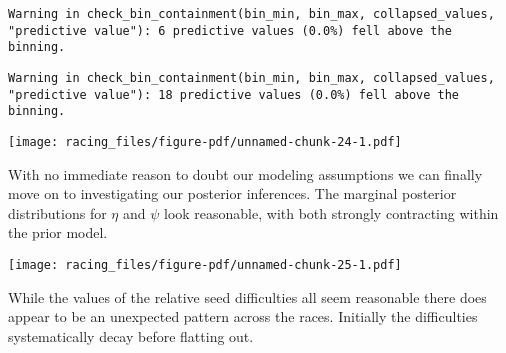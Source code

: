 \documentclass[
  letterpaper,
  DIV=11,
  numbers=noendperiod]{scrartcl}
\newenvironment{Shaded}{\begin{snugshade}}{\end{snugshade}}
\newcommand{\AttributeTok}[1]{\textcolor[rgb]{0.40,0.45,0.13}{#1}}
\newcommand{\DecValTok}[1]{\textcolor[rgb]{0.68,0.00,0.00}{#1}}
\newcommand{\FunctionTok}[1]{\textcolor[rgb]{0.28,0.35,0.67}{#1}}
\newcommand{\NormalTok}[1]{\textcolor[rgb]{0.00,0.23,0.31}{#1}}
\newcommand{\SpecialCharTok}[1]{\textcolor[rgb]{0.37,0.37,0.37}{#1}}
\newcommand{\StringTok}[1]{\textcolor[rgb]{0.13,0.47,0.30}{#1}}
\begin{document}
\begin{verbatim}
Warning in check_bin_containment(bin_min, bin_max, collapsed_values,
"predictive value"): 6 predictive values (0.0%) fell above the binning.
\end{verbatim}

\begin{verbatim}
Warning in check_bin_containment(bin_min, bin_max, collapsed_values,
"predictive value"): 18 predictive values (0.0%) fell above the binning.
\end{verbatim}

\texttt{[image: racing\_files/figure-pdf/unnamed-chunk-24-1.pdf]}

With no immediate reason to doubt our modeling assumptions we can
finally move on to investigating our posterior inferences. The marginal
posterior distributions for \(\eta\) and \(\psi\) look reasonable, with
both strongly contracting within the prior model.

\begin{Shaded}
\end{Shaded}

\texttt{[image: racing\_files/figure-pdf/unnamed-chunk-25-1.pdf]}

While the values of the relative seed difficulties all seem reasonable
there does appear to be an unexpected pattern across the races.
Initially the difficulties systematically decay before flatting out.
\end{document}
